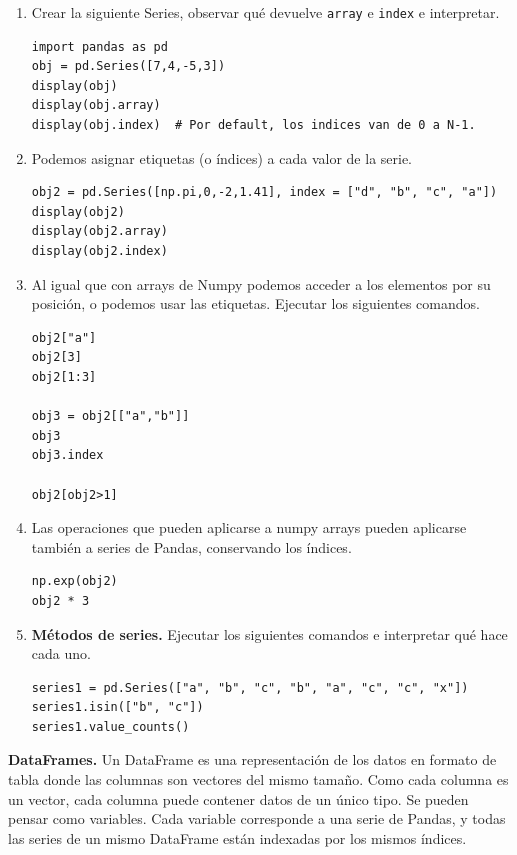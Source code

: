 \documentclass[a4paper,11pt]{article}
\theoremstyle{definition}
\begin{document}
\begin{enumerate}
\item Crear la siguiente Series, observar qué devuelve \lstinline{array} e \lstinline{index} e interpretar.

\begin{lstlisting}
import pandas as pd
obj = pd.Series([7,4,-5,3])
display(obj)
display(obj.array)
display(obj.index)  # Por default, los indices van de 0 a N-1.
\end{lstlisting}

\item Podemos asignar etiquetas (o \'indices) a cada valor de la serie.
\begin{lstlisting}
obj2 = pd.Series([np.pi,0,-2,1.41], index = ["d", "b", "c", "a"])
display(obj2)
display(obj2.array)
display(obj2.index)
\end{lstlisting}

\item Al igual que con arrays de Numpy podemos acceder a los elementos por su posici\'on, o podemos usar las etiquetas. Ejecutar los siguientes comandos.
\begin{lstlisting}
obj2["a"]
obj2[3]
obj2[1:3]

obj3 = obj2[["a","b"]]
obj3
obj3.index

obj2[obj2>1]
\end{lstlisting}

\item Las operaciones que pueden aplicarse a numpy arrays pueden aplicarse tambi\'en a series de Pandas, conservando los \'indices.
\begin{lstlisting}
np.exp(obj2)
obj2 * 3
\end{lstlisting}

\item \textbf{M\'etodos de series.} Ejecutar los siguientes comandos e interpretar qu\'e hace cada uno.
\begin{lstlisting}
series1 = pd.Series(["a", "b", "c", "b", "a", "c", "c", "x"])
series1.isin(["b", "c"])
series1.value_counts()
\end{lstlisting}

\end{enumerate}

\textbf{DataFrames.} Un DataFrame es una representaci\'on de los datos en formato de tabla donde las columnas son vectores del mismo tama\~no. Como cada columna es un vector, cada columna puede contener datos de un \'unico tipo. Se pueden pensar como variables. Cada variable corresponde a una serie de Pandas, y todas las series de un mismo DataFrame est\'an indexadas por los mismos \'indices.
\end{document}
